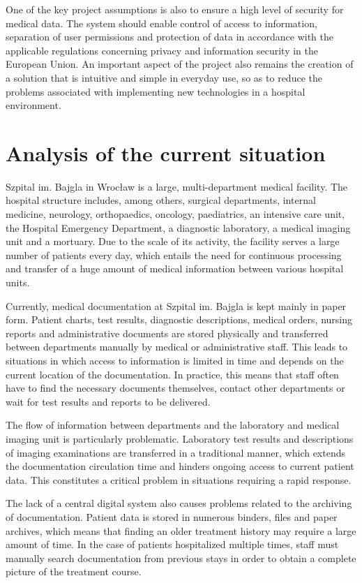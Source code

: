 One of the key project assumptions is also to ensure a high level of security for medical data. The system should enable control of access to information, separation of user permissions and protection of data in accordance with the applicable regulations concerning privacy and information security in the European Union. An important aspect of the project also remains the creation of a solution that is intuitive and simple in everyday use, so as to reduce the problems associated with implementing new technologies in a hospital environment.
\section{Analysis of the current situation}
Szpital im. Bajgla in Wrocław is a large, multi-department medical facility. The hospital structure includes, among others, surgical departments, internal medicine, neurology, orthopaedics, oncology, paediatrics, an intensive care unit, the Hospital Emergency Department, a diagnostic laboratory, a medical imaging unit and a mortuary. Due to the scale of its activity, the facility serves a large number of patients every day, which entails the need for continuous processing and transfer of a huge amount of medical information between various hospital units.

Currently, medical documentation at Szpital im. Bajgla is kept mainly in paper form. Patient charts, test results, diagnostic descriptions, medical orders, nursing reports and administrative documents are stored physically and transferred between departments manually by medical or administrative staff. This leads to situations in which access to information is limited in time and depends on the current location of the documentation. In practice, this means that staff often have to find the necessary documents themselves, contact other departments or wait for test results and reports to be delivered.

The flow of information between departments and the laboratory and medical imaging unit is particularly problematic. Laboratory test results and descriptions of imaging examinations are transferred in a traditional manner, which extends the documentation circulation time and hinders ongoing access to current patient data. This constitutes a critical problem in situations requiring a rapid response.

The lack of a central digital system also causes problems related to the archiving of documentation. Patient data is stored in numerous binders, files and paper archives, which means that finding an older treatment history may require a large amount of time. In the case of patients hospitalized multiple times, staff must manually search documentation from previous stays in order to obtain a complete picture of the treatment course.

